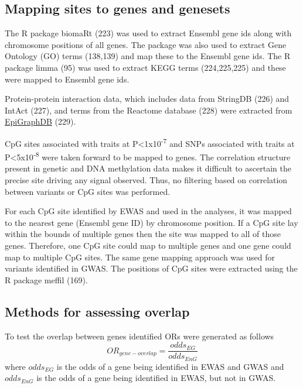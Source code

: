 \documentclass[11pt,twoside]{bristolthesis}
\begin{document}
\hypertarget{mapping-sites-to-genes-and-genesets}{%
\subsection{Mapping sites to genes and genesets}\label{mapping-sites-to-genes-and-genesets}}

The R package biomaRt (223) was used to extract Ensembl gene ids along with chromosome positions of all genes. The package was also used to extract Gene Ontology (GO) terms (138,139) and map these to the Ensembl gene ids. The R package limma (95) was used to extract KEGG terms (224,225,225) and these were mapped to Ensembl gene ids.

Protein-protein interaction data, which includes data from StringDB (226) and IntAct (227), and terms from the Reactome database (228) were extracted from \href{http://www.epigraphdb.org/}{EpiGraphDB} (229).

CpG sites associated with traits at P\textless1x10\textsuperscript{-7} and SNPs associated with traits at P\textless5x10\textsuperscript{-8} were taken forward to be mapped to genes. The correlation structure present in genetic and DNA methylation data makes it difficult to ascertain the precise site driving any signal observed. Thus, no filtering based on correlation between variants or CpG sites was performed.

For each CpG site identified by EWAS and used in the analyses, it was mapped to the nearest gene (Ensembl gene ID) by chromosome position. If a CpG site lay within the bounds of multiple genes then the site was mapped to all of those genes. Therefore, one CpG site could map to multiple genes and one gene could map to multiple CpG sites. The same gene mapping approach was used for variants identified in GWAS. The positions of CpG sites were extracted using the R package meffil (169).

\hypertarget{methods-for-assessing-overlap}{%
\subsection{Methods for assessing overlap}\label{methods-for-assessing-overlap}}

To test the overlap between genes identified ORs were generated as follows
\begin{equation}
    OR_{gene-overlap} = \frac{odds_{EG}} {odds_{EnG}}
    \label{eq:overlap-of-genes}
\end{equation}
where \(odds_{EG}\) is the odds of a gene being identified in EWAS and GWAS and \(odds_{EnG}\) is the odds of a gene being identified in EWAS, but not in GWAS.
\end{document}
